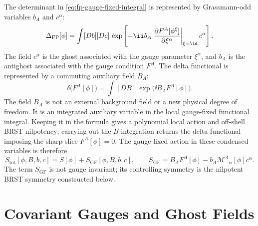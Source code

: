 The determinant in \eqref{eq:fp-gauge-fixed-integral} is represented by
Grassmann-odd variables \(b_A\) and \(c^\alpha\):
\begin{equation}
  \Delta_{\mathrm{FP}}[\phi]
  =
  \int[Db][Dc]\,
  \exp\left[
    -\ii b_A
    \left.
    \frac{\partial F^A[\phi^\xi]}{\partial\xi^\alpha}
    \right|_{\xi=\id}
    c^\alpha
  \right].
  \label{eq:general-ghost-determinant-bc}
\end{equation}
The field \(c^\alpha\) is the ghost associated with the gauge parameter
\(\xi^\alpha\), and \(b_A\) is the antighost associated with the gauge condition
\(F^A\).  The delta functional is represented by a commuting auxiliary field
\(B_A\):
\begin{equation}
  \delta\bigl(F^A[\phi]\bigr)
  =
  \int[DB]\,
  \exp\bigl(\ii B_A F^A[\phi]\bigr).
  \label{eq:delta-functional-b-field}
\end{equation}
The field \(B_A\) is not an external background field or a new physical
degree of freedom.  It is an integrated auxiliary variable in the local
gauge-fixed functional integral.  Keeping it in the formula gives a polynomial
local action and off-shell BRST nilpotency; carrying out the \(B\)-integration
returns the delta functional imposing the sharp slice \(F^A[\phi]=0\).
The gauge-fixed action in these condensed variables is therefore
\begin{equation}
  S_{\mathrm{tot}}[\phi,B,b,c]
  =
  S[\phi]+S_{\mathrm{GF}}[\phi,B,b,c],
  \qquad
  S_{\mathrm{GF}}
  =
  B_AF^A[\phi]-b_A\mathcal M^A{}_\alpha[\phi]c^\alpha .
  \label{eq:general-gauge-fixed-action}
\end{equation}
The term \(S_{\mathrm{GF}}\) is not gauge invariant; its controlling symmetry is
the nilpotent BRST symmetry constructed below.

\section{Covariant Gauges and Ghost Fields}

